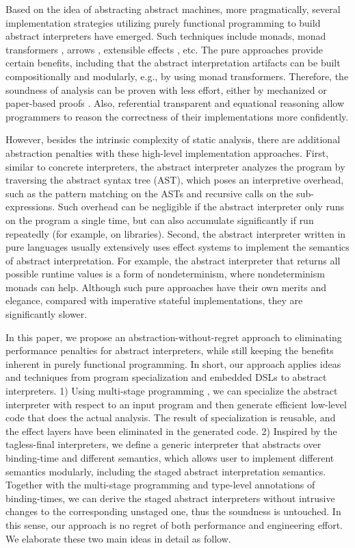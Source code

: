 Based on the idea of abstracting abstract machines, more
pragmatically, several implementation strategies utilizing purely
functional programming to build abstract interpreters have
emerged. Such techniques include monads, monad transformers
\cite{DBLP:journals/pacmpl/DaraisLNH17, Sergey:2013:MAI:2491956.2491979},
arrows \cite{Keidel:2018:CSP:3243631.3236767}, extensible effects
\cite{Githubsemantic}, etc.  The pure approaches provide certain
benefits, including that the abstract interpretation artifacts can be built
compositionally and modularly, e.g., by using monad
transformers. Therefore, the soundness of analysis can be proven with
less effort, either by mechanized \cite{Darais:2016:CGC:2951913.2951934}
or paper-based proofs \cite{Keidel:2018:CSP:3243631.3236767}. Also,
referential transparent and equational reasoning allow programmers to
reason the correctness of their implementations more confidently.

However, besides the intrinsic complexity of static analysis, there
are additional abstraction penalties with these high-level
implementation approaches.  First, similar to concrete interpreters,
the abstract interpreter analyzes the program by traversing the
abstract syntax tree (AST), which poses an interpretive overhead, such as
the pattern matching on the ASTs and recursive calls on the sub-expressions.
Such overhead can be negligible if the abstract
interpreter only runs on the program a single time, but can also
accumulate significantly if run repeatedly (for example, on
libraries).  Second, the abstract interpreter written in pure languages
usually extensively uses effect systems to implement the semantics of
abstract interpretation.  For example, the abstract interpreter that
returns all possible runtime values is a form of nondeterminism, where
nondeterminism monads can help.  Although such pure approaches have
their own merits and elegance, compared with imperative stateful
implementations, they are significantly slower.

In this paper, we propose an abstraction-without-regret approach to
eliminating performance penalties for abstract interpreters,
while still keeping the benefits inherent in purely functional
programming.  In short, our approach applies ideas and techniques from
program specialization and embedded DSLs to abstract interpreters. 1)
Using multi-stage programming , we can specialize the abstract
interpreter with respect to an input program and then generate
efficient low-level code that does the actual analysis.  The result of
specialization is reusable, and the effect layers have been eliminated
in the generated code. 2) Inspired by the tagless-final interpreters,
we define a generic interpreter that abstracts over binding-time and
different semantics, which allows user to implement different
semantics modularly, including the staged abstract interpretation
semantics.  Together with the multi-stage programming and type-level
annotations of binding-times, we can derive the staged abstract
interpreters without intrusive changes to the corresponding unstaged
one, thus the soundness is untouched.  In this sense, our approach is
no regret of both performance and engineering effort. We elaborate
these two main ideas in detail as follow.

